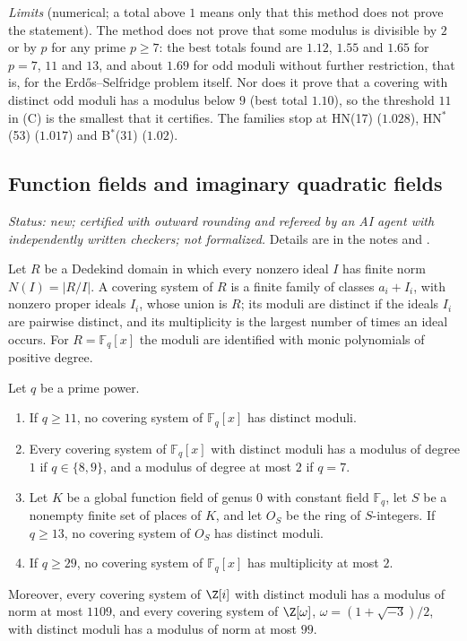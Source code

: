 \emph{Limits} (numerical; a total above $1$ means only that this method does not prove the statement). The method does
not prove that some modulus is divisible by $2$ or by $p$ for any prime $p\ge7$: the best totals found are $1.12$,
$1.55$ and $1.65$ for $p=7$, $11$ and $13$, and about $1.69$ for odd moduli without further restriction, that is, for
the Erd\H{o}s--Selfridge problem itself. Nor does it prove that a covering with distinct odd moduli has a modulus
below $9$ (best total $1.10$), so the threshold $11$ in (C) is the smallest that it certifies. The families stop
at HN(17) ($1.028$), HN$^*$(53) ($1.017$) and B$^*$(31) ($1.02$).

\subsection{Function fields and imaginary quadratic fields}\label{sec:rings}

\emph{Status: new; certified with outward rounding and refereed by an AI agent with independently written checkers;
not formalized.} Details are in the notes  and .

Let $R$ be a Dedekind domain in which every nonzero ideal $I$ has finite norm $N(I)=|R/I|$. A covering system of $R$
is a finite family of classes $a_i+I_i$, with nonzero proper ideals $I_i$, whose union is $R$; its moduli are distinct
if the ideals $I_i$ are pairwise distinct, and its multiplicity is the largest number of times an ideal occurs. For
$R=\mathbb{F}_q[x]$ the moduli are identified with monic polynomials of positive degree.

\begin{theorem}\label{thm:rings}
Let $q$ be a prime power.
\begin{enumerate}[label=(\alph*)]
\item If $q\ge11$, no covering system of $\mathbb{F}_q[x]$ has distinct moduli.
\item Every covering system of $\mathbb{F}_q[x]$ with distinct moduli has a modulus of degree $1$ if $q\in\{8,9\}$,
  and a modulus of degree at most $2$ if $q=7$.
\item Let $K$ be a global function field of genus $0$ with constant field $\mathbb{F}_q$, let $S$ be a nonempty finite
  set of places of $K$, and let $O_S$ be the ring of $S$-integers. If $q\ge13$, no covering system of $O_S$ has
  distinct moduli.
\item If $q\ge29$, no covering system of $\mathbb{F}_q[x]$ has multiplicity at most $2$.
\end{enumerate}
Moreover, every covering system of $\Z[i]$ with distinct moduli has a modulus of norm at most $1109$, and every
covering system of $\Z[\omega]$, $\omega=(1+\sqrt{-3})/2$, with distinct moduli has a modulus of norm at most $99$.
\end{theorem}

